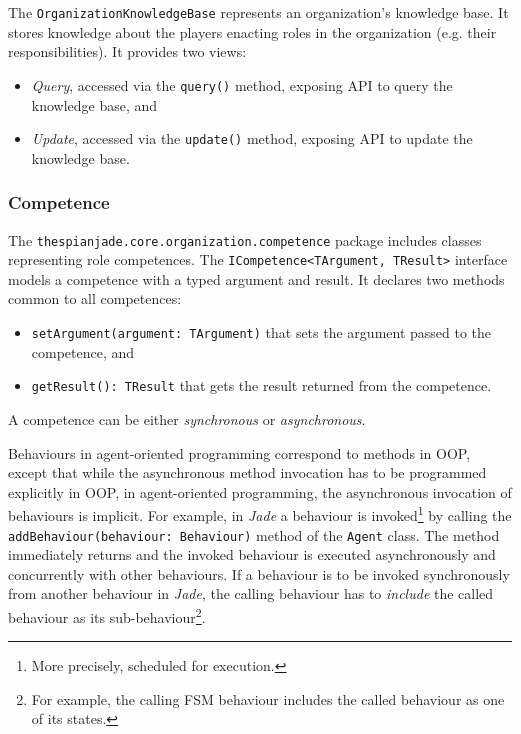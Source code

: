 The \texttt{OrganizationKnowledgeBase} represents an organization's knowledge base.
It stores knowledge about the players enacting roles in the organization (e.g. their responsibilities).
It provides two views:
\begin{itemize}
	\item \textit{Query}, accessed via the \texttt{query()} method, exposing API to query the knowledge base, and
	\item \textit{Update}, accessed via the \texttt{update()} method, exposing API to update the knowledge base.
\end{itemize}

\subsubsection{Competence}

The \texttt{thespianjade.core.organization.competence} package includes classes representing role competences.
The \texttt{ICompetence<TArgument, TResult>} interface models a competence with a typed argument and result.
It declares two methods common to all competences:
\begin{itemize}
	\item \texttt{setArgument(argument: TArgument)} that sets the argument passed to the competence, and
	\item \texttt{getResult(): TResult} that gets the result returned from the competence.
\end{itemize}

A competence can be either \textit{synchronous} or \textit{asynchronous}.

Behaviours in agent-oriented programming correspond to methods in OOP, except that while the asynchronous method invocation has to be programmed explicitly in OOP, in agent-oriented programming, the asynchronous invocation of behaviours is implicit.
For example, in \textit{Jade} a behaviour is invoked\footnote{More precisely, scheduled for execution.} by calling the \texttt{addBehaviour(behaviour: Behaviour)} method of the \texttt{Agent} class.
The method immediately returns and the invoked behaviour is executed asynchronously and concurrently with other behaviours.
If a behaviour is to be invoked synchronously from another behaviour in \textit{Jade}, the calling behaviour has to \textit{include} the called behaviour as its sub-behaviour\footnote{For example, the calling FSM behaviour includes the called behaviour as one of its states.}.

